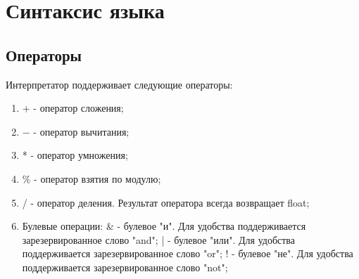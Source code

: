 \documentclass[../Language-declaration.tex]{subfiles}
\begin{document}
    \chapter{Синтаксис языка}
        \section{Операторы}
            Интерпретатор поддерживает следующие операторы:
        \begin{enumerate}
         \item + - оператор сложения;
         \item $-$ - оператор вычитания;
         \item * - оператор умножения;
         \item \% - оператор взятия по модулю;
         \item / - оператор деления. Результат оператора всегда возвращает float;
         \item Булевые операции:
            \subitem \& - булевое "и". Для удобства поддерживается зарезервированное слово "and";
            \subitem | - булевое "или". Для удобства поддерживается зарезервированное слово "or";
            \subitem ! - булевое "не". Для удобства поддерживается зарезервированное слово "not";
        \end{enumerate}
\end{document}
